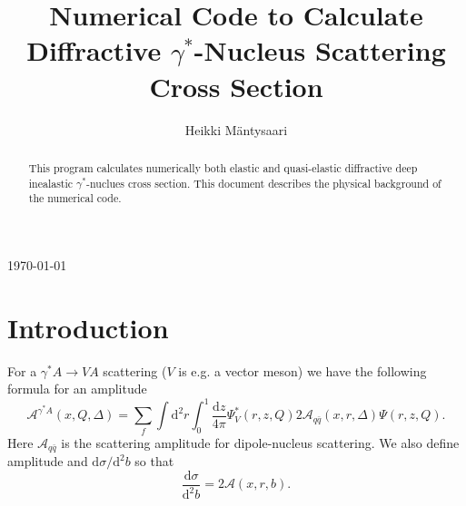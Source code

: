 \documentclass[a4paper,12pt]{article}
\title{Numerical Code to Calculate Diffractive $\gamma^*$-Nucleus Scattering Cross Section}
\author{Heikki Mäntysaari}
\date{}
\newcommand{\der}{\mathrm{d}}
\newcommand{\A}{\mathcal{A}}
\begin{document}
 
\maketitle
\begin{center}\today\end{center}
\begin{abstract}
This program calculates numerically both elastic and quasi-elastic diffractive deep inealastic $\gamma^*$-nuclues cross section. This document describes the physical background of the numerical code.
\end{abstract}


\section{Introduction}
For a $\gamma^*A \rightarrow VA$ scattering ($V$ is e.g. a vector meson) we have the following formula for an amplitude \cite{Caldwell:2009ke}
\begin{equation}
	\A^{\gamma^* A}(x,Q,\Delta) =	\sum_f \int \der^2 r \int_0^1 \frac{\der z}{4\pi} \Psi_V^*(r,z,Q) 2\A_{q\bar q}(x,r,\Delta) \Psi(r,z,Q).
\end{equation}
Here $\A_{q\bar q}$ is the scattering amplitude for dipole-nucleus scattering. We also define amplitude and $\der \sigma/\der^2 b$ so that
\begin{equation}
	\frac{\der \sigma}{\der^2 b} = 2\A(x,r,b).
\end{equation}
\end{document}
